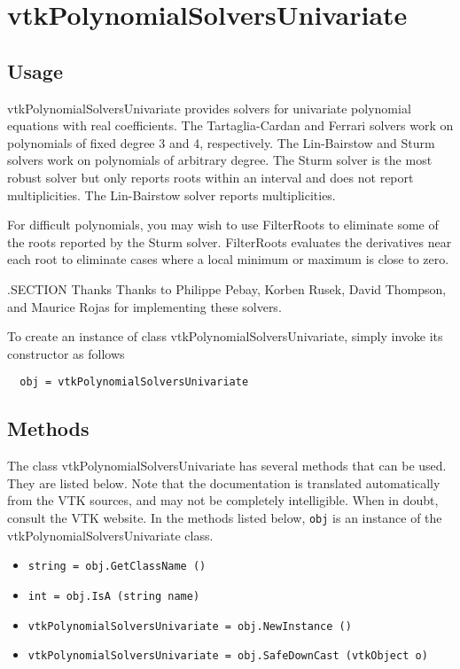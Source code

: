 \section{vtkPolynomialSolversUnivariate}

\subsection{Usage}

 vtkPolynomialSolversUnivariate provides solvers for
 univariate polynomial equations with real coefficients.
 The Tartaglia-Cardan and Ferrari solvers work on polynomials of fixed
 degree 3 and 4, respectively.
 The Lin-Bairstow and Sturm solvers work on polynomials of arbitrary
 degree. The Sturm solver is the most robust solver but only reports
 roots within an interval and does not report multiplicities.
 The Lin-Bairstow solver reports multiplicities.

 For difficult polynomials, you may wish to use FilterRoots to
 eliminate some of the roots reported by the Sturm solver.
 FilterRoots evaluates the derivatives near each root to
 eliminate cases where a local minimum or maximum is close
 to zero.

 .SECTION Thanks
 Thanks to Philippe Pebay, Korben Rusek, David Thompson, and Maurice Rojas
 for implementing these solvers.

To create an instance of class vtkPolynomialSolversUnivariate, simply
invoke its constructor as follows
\begin{verbatim}
  obj = vtkPolynomialSolversUnivariate
\end{verbatim}
\subsection{Methods}

The class vtkPolynomialSolversUnivariate has several methods that can be used.
  They are listed below.
Note that the documentation is translated automatically from the VTK sources,
and may not be completely intelligible.  When in doubt, consult the VTK website.
In the methods listed below, \verb|obj| is an instance of the vtkPolynomialSolversUnivariate class.
\begin{itemize}
\item  \verb|string = obj.GetClassName ()|

\item  \verb|int = obj.IsA (string name)|

\item  \verb|vtkPolynomialSolversUnivariate = obj.NewInstance ()|

\item  \verb|vtkPolynomialSolversUnivariate = obj.SafeDownCast (vtkObject o)|

\end{itemize}

